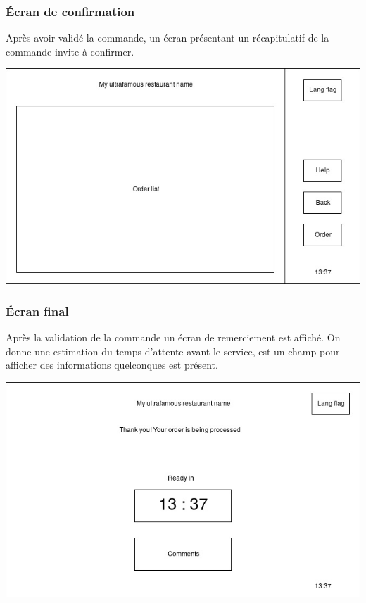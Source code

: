 \documentclass[a4paper,12pt]{article}
\begin{document}
\subsubsection{Écran de confirmation}
Après avoir validé la commande, un écran présentant un récapitulatif de la commande invite à confirmer.

\begin{center}
	\includegraphics[width=\textwidth]{confirmation_screen.jpg}
\end{center}

\subsubsection{Écran final}

Après la validation de la commande un écran de remerciement est affiché. On donne une estimation du temps d'attente
avant le service, est un champ pour afficher des informations quelconques est présent.

\begin{center}
	\includegraphics[width=\textwidth]{final_screen.jpg}
\end{center}
\end{document}
